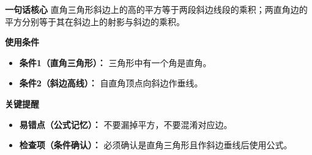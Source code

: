 \begin{summarybox}
	\textbf{\textcolor{CSummary}{一句话核心}}
	直角三角形斜边上的高的平方等于两段斜边线段的乘积；两直角边的平方分别等于其在斜边上的射影与斜边的乘积。

	\medskip
	\textbf{\textcolor{CSummary}{使用条件}}
	\begin{itemize}[leftmargin=*, itemsep=0.5em, topsep=0.4em]
		\item \textbf{条件1（直角三角形）：} 三角形中有一个角是直角。
		\item \textbf{条件2（斜边高线）：} 自直角顶点向斜边作垂线。
	\end{itemize}

	\medskip
	\textbf{\textcolor{CSummary}{关键提醒}}
	\begin{itemize}[leftmargin=*, itemsep=0.5em, topsep=0.4em]
		\item \textbf{易错点（公式记忆）：} 不要漏掉平方，不要混淆对应边。
		\item \textbf{检查项（条件确认）：} 必须确认是直角三角形且作斜边垂线后使用公式。
	\end{itemize}

\end{summarybox}

